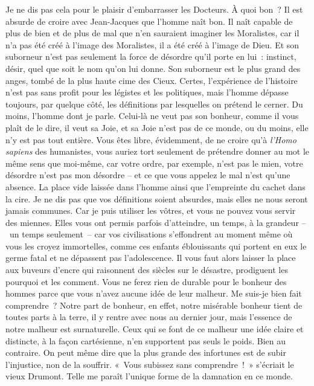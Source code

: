 \documentclass[french,twoside]{book} %
\begin{document}
Je ne dis pas cela pour le plaisir d’embarrasser les Docteurs. À quoi bon ? Il est absurde de croire avec Jean-Jacques que l’homme naît bon. Il naît capable de plus de bien et de plus de mal que n’en sauraient imaginer les Moralistes, car il n’a pas été créé à l’image des Moralistes, il a été créé à l’image de Dieu. Et son suborneur n’est pas seulement la force de désordre qu’il porte en lui : instinct, désir, quel que soit le nom qu’on lui donne. Son suborneur est le plus grand des anges, tombé de la plus haute cime des Cieux. Certes, l’expérience de l’histoire n’est pas sans profit pour les légistes et les politiques, mais l’homme dépasse toujours, par quelque côté, les définitions par lesquelles on prétend le cerner. Du moins, l’homme dont je parle. Celui-là ne veut pas son bonheur, comme il vous plaît de le dire, il veut sa Joie, et sa Joie n’est pas de ce monde, ou du moins, elle n’y est pas tout entière. Vous êtes libre, évidemment, de ne croire qu’à \emph{l’Homo sapiens} des humanistes, vous auriez tort seulement de prétendre donner au mot le même sens que moi-même, car votre ordre, par exemple, n’est pas le mien, votre désordre n’est pas mon désordre – et ce que vous appelez le mal n’est qu’une absence. La place vide laissée dans l’homme ainsi que l’empreinte du cachet dans la cire. Je ne dis pas que vos définitions soient absurdes, mais elles ne nous seront jamais communes. Car je puis utiliser les vôtres, et vous ne pouvez vous servir des miennes. Elles vous ont permis parfois d’atteindre, un temps, à la grandeur – un temps seulement – car vos civilisations s’effondrent au moment même où vous les croyez immortelles, comme ces enfants éblouissants qui portent en eux le germe fatal et ne dépassent pas l’adolescence. Il vous faut alors laisser la place aux buveurs d’encre qui raisonnent des siècles sur le désastre, prodiguent les pourquoi et les comment. Vous ne ferez rien de durable pour le bonheur des hommes parce que vous n’avez aucune idée de leur malheur. Me suis-je bien fait comprendre ? Notre part de bonheur, en effet, notre misérable bonheur tient de toutes parts à la terre, il y rentre avec nous au dernier jour, mais l’essence de notre malheur est surnaturelle. Ceux qui se font de ce malheur une idée claire et distincte, à la façon cartésienne, n’en supportent pas seuls le poids. Bien au contraire. On peut même dire que la plus grande des infortunes est de subir l’injustice, non de la souffrir. « Vous subissez sans comprendre ! » s’écriait le vieux Drumont. Telle me paraît l’unique forme de la damnation en ce monde.\par
\end{document}
